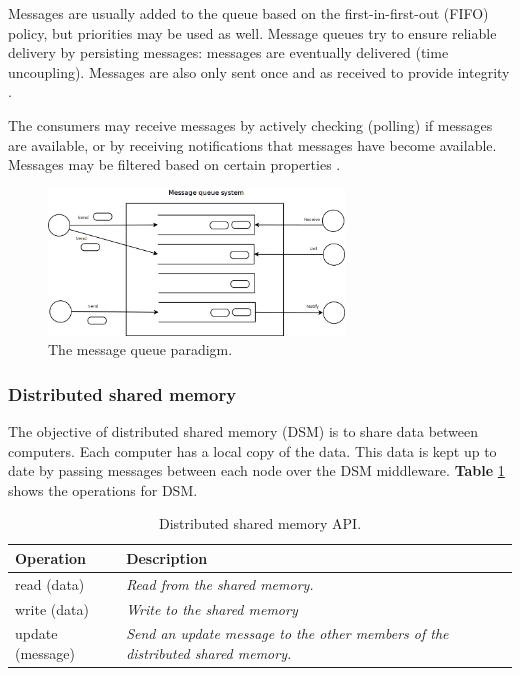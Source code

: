 Messages are usually added to the queue based on the first-in-first-out (FIFO) policy, but priorities may be used as well. Message queues try to ensure reliable delivery by persisting messages: messages are eventually delivered (time uncoupling). Messages are also only sent once and as received to provide integrity \cite{Coulouris:2011:DSC:2029110}.

The consumers may receive messages by actively checking (polling) if messages are available, or by receiving notifications that messages have become available. Messages may be filtered based on certain properties \cite{Coulouris:2011:DSC:2029110}.

\begin{figure}[h]
	\begin{center}
		\includegraphics[width=0.7\textwidth]{img/systems-and-architectures/messagequeues}
	\end{center}
	\caption{The message queue paradigm.}
	\label{fig:messagequeues}
\end{figure}



\subsubsection{Distributed shared memory}

The objective of distributed shared memory (DSM) is to share data between computers. Each computer has a local copy of the data. This data is kept up to date by passing messages between each node over the DSM middleware. \textbf{Table} \ref{tab:api:dsm} shows the operations for DSM.

\begin{table}[h]
	\caption{Distributed shared memory API.}
	\label{tab:api:dsm}
	\begin{tabular}{p{150px} | p{250px}}
		\textbf{Operation} & \textbf{Description} \\
		\hline
		read (data) 			& \emph{Read from the shared memory.} \\
		write (data) 			& \emph{Write to the shared memory} \\
		update (message) 	& \emph{Send an update message to the other members of the distributed shared memory.} \\
		\hline
	\end{tabular}
\end{table}


